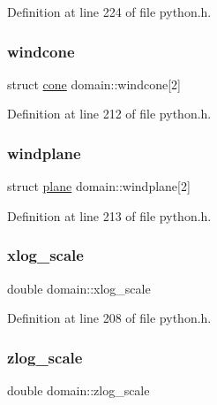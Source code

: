 Definition at line 224 of file python.\+h.

\mbox{\label{structdomain_a0e5379ee2681d481ee329735231ced7a}} 
\subsubsection{\texorpdfstring{windcone}{windcone}}
{\footnotesize\ttfamily struct \hyperlink{structcone}{cone} domain\+::windcone\mbox{[}2\mbox{]}}



Definition at line 212 of file python.\+h.

\mbox{\label{structdomain_ad59a0e0fc4c056c9b75ff1d1c3a0f06c}} 
\subsubsection{\texorpdfstring{windplane}{windplane}}
{\footnotesize\ttfamily struct \hyperlink{structplane}{plane} domain\+::windplane\mbox{[}2\mbox{]}}



Definition at line 213 of file python.\+h.

\mbox{\label{structdomain_a9877c9ee2824450fd9107f8b93b4f267}} 
\subsubsection{\texorpdfstring{xlog\+\_\+scale}{xlog\_scale}}
{\footnotesize\ttfamily double domain\+::xlog\+\_\+scale}



Definition at line 208 of file python.\+h.

\mbox{\label{structdomain_a8fd2202427974acf456e95506e2dce8e}} 
\subsubsection{\texorpdfstring{zlog\+\_\+scale}{zlog\_scale}}
{\footnotesize\ttfamily double domain\+::zlog\+\_\+scale}



